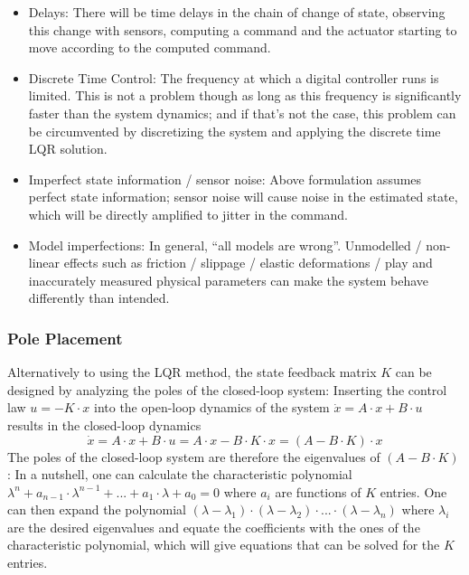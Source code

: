 \documentclass{article}
\begin{document}
\begin{itemize}
	\item Delays: There will be time delays in the chain of change of state, observing this change with sensors, computing a command and the actuator starting to move according to the computed command.
	\item Discrete Time Control: The frequency at which a digital controller runs is limited. This is not a problem though as long as this frequency is significantly faster than the system dynamics; and if that's not the case, this problem can be circumvented by discretizing the system and applying the discrete time LQR solution.
	\item Imperfect state information / sensor noise: Above formulation assumes perfect state information; sensor noise will cause noise in the estimated state, which will be directly amplified to jitter in the command.
	\item Model imperfections: In general, ``all models are wrong''.
	Unmodelled / non-linear effects such as friction / slippage / elastic deformations / play and inaccurately measured physical parameters can make the system behave differently than intended.
\end{itemize}

\subsubsection{Pole Placement}
Alternatively to using the LQR method, the state feedback matrix $K$ can be designed by analyzing the poles of the closed-loop system:
Inserting the control law $u = -K \cdot x$ into the open-loop dynamics of the system $\dot{x} = A \cdot x + B \cdot u$ results in the closed-loop dynamics
\begin{equation}
\dot{x} = A \cdot x + B \cdot u = A \cdot x - B \cdot K \cdot x = (A - B \cdot K) \cdot x
\end{equation}
The poles of the closed-loop system are therefore the eigenvalues of $(A - B \cdot K)$:
In a nutshell, one can calculate the characteristic polynomial $\lambda^n + a_{n-1} \cdot \lambda^{n-1} + ... + a_1  \cdot \lambda + a_0 = 0$ where $a_i$ are functions of $K$ entries.
One can then expand the polynomial $(\lambda-\lambda_1) \cdot (\lambda-\lambda_2) \cdot ... \cdot (\lambda-\lambda_n)$ where $\lambda_i$ are the desired eigenvalues and equate the coefficients with the ones of the characteristic polynomial, which will give equations that can be solved for the $K$ entries.
\end{document}
